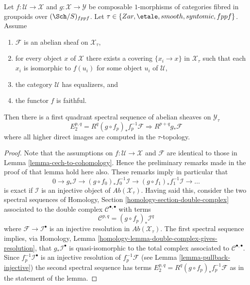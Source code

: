 \begin{lemma}
\label{lemma-cech-to-cohomology-relative}
Let $f : \mathcal{U} \to \mathcal{X}$ and
$g : \mathcal{X} \to \mathcal{Y}$
be composable $1$-morphisms of categories fibred
in groupoids over $(\Sch/S)_{fppf}$. Let
$\tau \in \{Zar, \etale, smooth, syntomic, \linebreak[0] fppf\}$.
Assume
\begin{enumerate}
\item $\mathcal{F}$ is an abelian sheaf on $\mathcal{X}_\tau$,
\item for every object $x$ of $\mathcal{X}$ there exists a covering
$\{x_i \to x\}$ in $\mathcal{X}_\tau$ such that each $x_i$ is isomorphic
to $f(u_i)$ for some object $u_i$ of $\mathcal{U}$,
\item the category $\mathcal{U}$ has equalizers, and
\item the functor $f$ is faithful.
\end{enumerate}
Then there is a first quadrant spectral sequence of abelian sheaves
on $\mathcal{Y}_\tau$
$$
E_2^{p, q} = R^q(g \circ f_p)_*f_p^{-1}\mathcal{F}
\Rightarrow
R^{p + q}g_*\mathcal{F}
$$
where all higher direct images are computed in the $\tau$-topology.
\end{lemma}

\begin{proof}
Note that the assumptions on $f : \mathcal{U} \to \mathcal{X}$
and $\mathcal{F}$ are identical to those in
Lemma \ref{lemma-cech-to-cohomology}.
Hence the preliminary remarks made in the proof of that lemma
hold here also. These remarks imply in particular that
$$
0 \to g_*\mathcal{I} \to
(g \circ f_0)_*f_0^{-1}\mathcal{I} \to
(g \circ f_1)_*f_1^{-1}\mathcal{I} \to \ldots
$$
is exact if $\mathcal{I}$ is an injective object of
$\textit{Ab}(\mathcal{X}_\tau)$.
Having said this, consider the two spectral sequences of
Homology, Section \ref{homology-section-double-complex}
associated to the double complex $\mathcal{C}^{\bullet, \bullet}$ with terms
$$
\mathcal{C}^{p, q} = (g \circ f_p)_*\mathcal{I}^q
$$
where $\mathcal{F} \to \mathcal{I}^\bullet$ is an injective resolution
in $\textit{Ab}(\mathcal{X}_\tau)$. The first spectral sequence implies, via
Homology, Lemma \ref{homology-lemma-double-complex-gives-resolution},
that $g_*\mathcal{I}^\bullet$ is quasi-isomorphic to the total complex
associated to $\mathcal{C}^{\bullet, \bullet}$.
Since $f_p^{-1}\mathcal{I}^\bullet$ is an injective resolution of
$f_p^{-1}\mathcal{F}$ (see
Lemma \ref{lemma-pullback-injective})
the second spectral sequence has terms
$E_2^{p, q} = R^q(g \circ f_p)_*f_p^{-1}\mathcal{F}$ as in the statement
of the lemma.
\end{proof}

